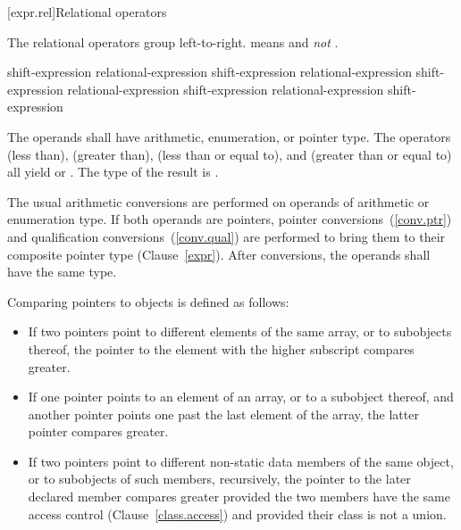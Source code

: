 [expr.rel]{Relational operators}%
%

\pnum
The relational operators group left-to-right.
\enterexample 
{} means  and \emph{not}
.
\exitexample 

%
%
%
%
%
%
%
%
%
\begin{bnf}
\br
    shift-expression\br
    relational-expression \terminal{<} shift-expression\br
    relational-expression \terminal{>} shift-expression\br
    relational-expression \terminal{<=} shift-expression\br
    relational-expression \terminal{>=} shift-expression
\end{bnf}

The operands shall have arithmetic, enumeration, or pointer type. The
operators \tcode{<} (less than), \tcode{>} (greater than), \tcode{<=}
(less than or equal to), and \tcode{>=} (greater than or equal to) all
yield  or . The type of the result is
.

\pnum
The usual arithmetic conversions are performed on operands of arithmetic
or enumeration type. If both operands are pointers, pointer
conversions~(\ref{conv.ptr}) and qualification conversions~(\ref{conv.qual})
are performed to bring
them to their composite pointer type (Clause~\ref{expr}).
After conversions, the operands shall have the same type.

\pnum
Comparing pointers to objects is defined as follows:

\begin{itemize}
\item If two pointers point to different elements of the same array, or to
subobjects thereof, the pointer to the element with the higher subscript
compares greater.

\item If one pointer points to an element of an array, or to a subobject
thereof, and another pointer points one past the last element of the array, the
latter pointer compares greater.

\item If two pointers point to different non-static data members of the same
object, or to subobjects of such members, recursively,
the pointer to the later declared member compares greater provided the
two members
have the same access control (Clause~\ref{class.access})
and provided their class is not a union.

\end{itemize}

